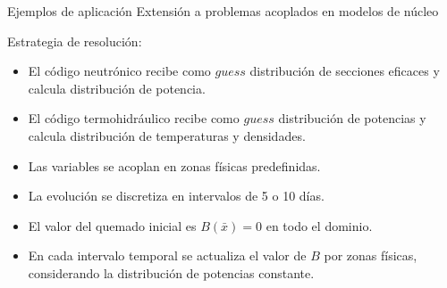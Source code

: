 \normalsize
\begin{frame}
{Ejemplos de aplicación}
{Extensión a problemas acoplados en modelos de núcleo}

Estrategia de resolución:

\begin{itemize}
\item <2-> El código neutrónico recibe como $guess$ distribución de secciones eficaces y calcula distribución de potencia.
\item <3-> El código termohidráulico recibe como $guess$ distribución de potencias y calcula distribución de temperaturas y densidades.
\item <4-> Las variables se acoplan en zonas físicas predefinidas.
\item <5-> La evolución se discretiza en intervalos de 5 o 10 días.
\item <6-> El valor del quemado inicial es $B(\bar{x})=0$ en todo el dominio.
\item <7-> En cada intervalo temporal se actualiza el valor de $B$ por zonas físicas, considerando la distribución de potencias constante.

\end{itemize}

\end{frame}



